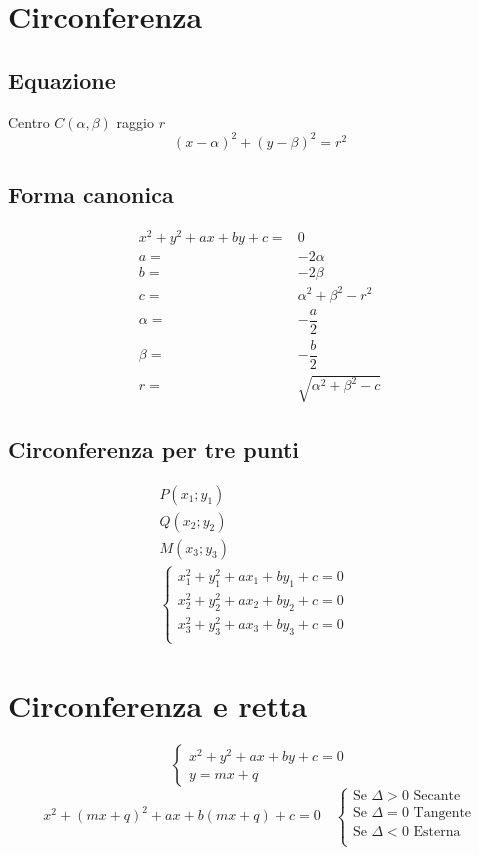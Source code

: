 \chapter{Circonferenza}
\section{Equazione}
Centro $C(\alpha,\beta)$ raggio $r$
\begin{equation}
(x-\alpha)^2+(y-\beta)^2=r^2
\end{equation}
\section{Forma canonica}
\begin{align}
x^2+y^2+ax+by+c=&0\\
a=&-2\alpha\\
b=&-2\beta\\
c=&\alpha^2+\beta^2-r^2\\
\alpha=&-\dfrac{a}{2}\\
\beta=&-\dfrac{b}{2}\\
r=&\sqrt{\alpha^2+\beta^2-c}
\end{align}

\section{Circonferenza per tre punti}
\begin{align}
P(x_1;y_1)&\\
Q(x_2;y_2)&\\
M(x_3;y_3)&\\
\begin{cases}
x_1^2+y_1^2+ax_1+by_1+c=0\\
x_2^2+y_2^2+ax_2+by_2+c=0\\
x_3^2+y_3^2+ax_3+by_3+c=0\\
\end{cases}&
\end{align}
\chapter{Circonferenza e retta}
\begin{equation}
\begin{cases}
x^2+y^2+ax+by+c=0\\
y=mx+q
\end{cases}
\end{equation}
\begin{equation}
x^2+(mx+q)^2+ax+b(mx+q)+c=0\quad\begin{cases}
\text{Se $\Delta >0$ Secante}\\
\text{Se $\Delta =0$ Tangente}\\
\text{Se $\Delta <0$ Esterna}\\
\end{cases}
\end{equation}
